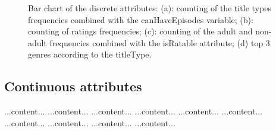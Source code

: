 \begin{figure}[h!]
    \centering
    \caption{Bar chart of the discrete attributes: (a): counting of the title types frequencies combined with the canHaveEpisodes variable; (b): counting of ratings frequencies; (c): counting of the adult and non-adult frequencies combined with the isRatable attribute; (d) top 3 genres according to the titleType.}
    \label{fig:bar-charts}
\end{figure}

\subsection{Continuous attributes}
...content...
...content...
...content...
...content...
...content...
...content...
...content...
...content...
...content...
...content...




